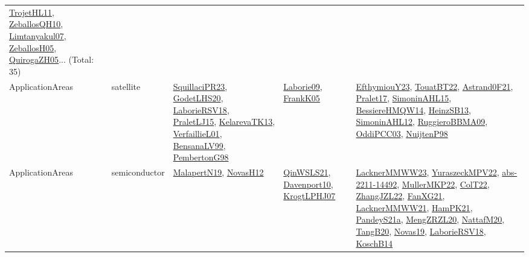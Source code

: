 {\begin{longtable}{lp{3cm}>{\raggedright}p{6cm}>{\raggedright}p{6cm}p{8cm}}
\href{articles/TrojetHL11.pdf}{TrojetHL11}\cite{TrojetHL11}, \href{articles/ZeballosQH10.pdf}{ZeballosQH10}\cite{ZeballosQH10}, \href{papers/Limtanyakul07.pdf}{Limtanyakul07}\cite{Limtanyakul07}, \href{articles/ZeballosH05.pdf}{ZeballosH05}\cite{ZeballosH05}, \href{papers/QuirogaZH05.pdf}{QuirogaZH05}\cite{QuirogaZH05}... (Total: 35)\\
ApplicationAreas & satellite & \href{papers/SquillaciPR23.pdf}{SquillaciPR23}\cite{SquillaciPR23}, \href{papers/GodetLHS20.pdf}{GodetLHS20}\cite{GodetLHS20}, \href{articles/LaborieRSV18.pdf}{LaborieRSV18}\cite{LaborieRSV18}, \href{papers/PraletLJ15.pdf}{PraletLJ15}\cite{PraletLJ15}, \href{papers/KelarevaTK13.pdf}{KelarevaTK13}\cite{KelarevaTK13}, \href{papers/VerfaillieL01.pdf}{VerfaillieL01}\cite{VerfaillieL01}, \href{articles/BensanaLV99.pdf}{BensanaLV99}\cite{BensanaLV99}, \href{papers/PembertonG98.pdf}{PembertonG98}\cite{PembertonG98} & \href{papers/Laborie09.pdf}{Laborie09}\cite{Laborie09}, \href{papers/FrankK05.pdf}{FrankK05}\cite{FrankK05} & \href{papers/EfthymiouY23.pdf}{EfthymiouY23}\cite{EfthymiouY23}, \href{papers/TouatBT22.pdf}{TouatBT22}\cite{TouatBT22}, \href{papers/Astrand0F21.pdf}{Astrand0F21}\cite{Astrand0F21}, \href{papers/Pralet17.pdf}{Pralet17}\cite{Pralet17}, \href{articles/SimoninAHL15.pdf}{SimoninAHL15}\cite{SimoninAHL15}, \href{papers/BessiereHMQW14.pdf}{BessiereHMQW14}\cite{BessiereHMQW14}, \href{articles/HeinzSB13.pdf}{HeinzSB13}\cite{HeinzSB13}, \href{papers/SimoninAHL12.pdf}{SimoninAHL12}\cite{SimoninAHL12}, \href{articles/RuggieroBBMA09.pdf}{RuggieroBBMA09}\cite{RuggieroBBMA09}, \href{papers/OddiPCC03.pdf}{OddiPCC03}\cite{OddiPCC03}, \href{articles/NuijtenP98.pdf}{NuijtenP98}\cite{NuijtenP98}\\
ApplicationAreas & semiconductor & \href{papers/MalapertN19.pdf}{MalapertN19}\cite{MalapertN19}, \href{articles/NovasH12.pdf}{NovasH12}\cite{NovasH12} & \href{articles/QinWSLS21.pdf}{QinWSLS21}\cite{QinWSLS21}, \href{papers/Davenport10.pdf}{Davenport10}\cite{Davenport10}, \href{papers/KrogtLPHJ07.pdf}{KrogtLPHJ07}\cite{KrogtLPHJ07} & \href{articles/LacknerMMWW23.pdf}{LacknerMMWW23}\cite{LacknerMMWW23}, \href{articles/YuraszeckMPV22.pdf}{YuraszeckMPV22}\cite{YuraszeckMPV22}, \href{articles/abs-2211-14492.pdf}{abs-2211-14492}\cite{abs-2211-14492}, \href{articles/MullerMKP22.pdf}{MullerMKP22}\cite{MullerMKP22}, \href{articles/ColT22.pdf}{ColT22}\cite{ColT22}, \href{papers/ZhangJZL22.pdf}{ZhangJZL22}\cite{ZhangJZL22}, \href{articles/FanXG21.pdf}{FanXG21}\cite{FanXG21}, \href{papers/LacknerMMWW21.pdf}{LacknerMMWW21}\cite{LacknerMMWW21}, \href{articles/HamPK21.pdf}{HamPK21}\cite{HamPK21}, \href{articles/PandeyS21a.pdf}{PandeyS21a}\cite{PandeyS21a}, \href{articles/MengZRZL20.pdf}{MengZRZL20}\cite{MengZRZL20}, \href{papers/NattafM20.pdf}{NattafM20}\cite{NattafM20}, \href{papers/TangB20.pdf}{TangB20}\cite{TangB20}, \href{articles/Novas19.pdf}{Novas19}\cite{Novas19}, \href{articles/LaborieRSV18.pdf}{LaborieRSV18}\cite{LaborieRSV18}, \href{papers/KoschB14.pdf}{KoschB14}\cite{KoschB14}\\

\end{longtable}}
